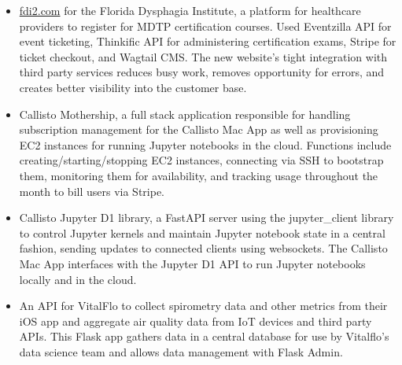 \begin{cventries}
{\begin{cvitems}
{\begin{itemize}[leftmargin=2ex, nosep, noitemsep]
            \item {\href{https://fdi2.com}{fdi2.com} for the Florida Dysphagia Institute, a platform for healthcare providers to register for MDTP certification courses. Used Eventzilla API for event ticketing, Thinkific API for administering certification exams, Stripe for ticket checkout, and Wagtail CMS. The new website's tight integration with third party services reduces busy work, removes opportunity for errors, and creates better visibility into the customer base.}
            \item {Callisto Mothership, a full stack application responsible for handling subscription management for the Callisto Mac App as well as provisioning EC2 instances for running Jupyter notebooks in the cloud. Functions include creating/starting/stopping EC2 instances, connecting via SSH to bootstrap them, monitoring them for availability, and tracking usage throughout the month to bill users via Stripe.}
            \item {Callisto Jupyter D1 library, a FastAPI server using the jupyter\_client library to control Jupyter kernels and maintain Jupyter notebook state in a central fashion, sending updates to connected clients using websockets. The Callisto Mac App interfaces with the Jupyter D1 API to run Jupyter notebooks locally and in the cloud.}
            \item {An API for VitalFlo to collect spirometry data and other metrics from their iOS app and aggregate air quality data from IoT devices and third party APIs. This Flask app gathers data in a central database for use by Vitalflo's data science team and allows data management with Flask Admin.}
          \end{itemize}}
      \end{cvitems}
    }


\end{cventries}
